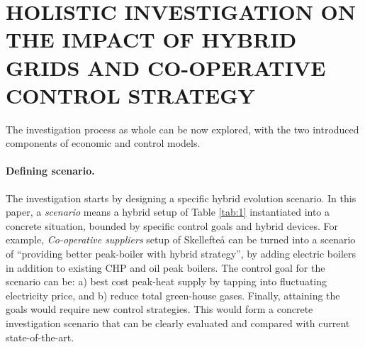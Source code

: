 \documentclass[a4paper,twoside]{article}
\begin{document}

\section{\uppercase{Holistic Investigation on the Impact of Hybrid Grids and  Co-operative Control Strategy
}}
\label{sec:hol} 
\noindent
The investigation process as whole can be now explored, with the two
introduced components of economic and control models.


\paragraph{Defining scenario.} 
\noindent
The investigation starts by designing a specific hybrid evolution
scenario. In this paper, a {\em scenario} means a hybrid setup of Table
\ref{tab:1} instantiated into a concrete situation, bounded by
specific control goals and hybrid devices. For example, {\em 
  Co-operative suppliers} setup of Skellefte{\aa} can be turned into a 
scenario of ``providing better peak-boiler with hybrid strategy'', by
adding electric boilers in addition to existing CHP and oil peak
boilers. The control goal for the scenario can be: a) best cost
peak-heat supply by tapping into fluctuating electricity price, and b)
reduce total green-house gases. Finally, attaining the goals would
require new control strategies.  
This would form a concrete investigation scenario that can be clearly
evaluated and compared with current state-of-the-art.  
\end{document}
